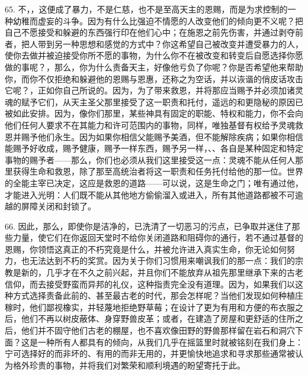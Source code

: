 65. 不，，这便成了暴力，不是仁慈，也不是至高天主的恩赐，而是为求控制的一种幼稚而虚妄的斗争。因为有什么比强迫不情愿的人改变他们的倾向更不义呢？把自己不愿接受和躲避的东西强行印在他们心中；在施恩之前先伤害，并通过剥夺前者，把人带到另一种思想和感觉的方式中？你这希望自己被改变并遭受暴力的人，使你去做并被迫接受你所不愿的事物，为什么你不在被改变和转变后自愿选择你愿做的事呢？，那么，你为什么责备天主，好像他亏负了你呢？你是否希望他来帮助你，而你不仅拒绝和躲避他的恩赐与恩惠，还称之为空话，并以诙谐的俏皮话攻击它呢？，正如你自己所说的。因为，为了带来救恩，并将那应当赐予并必须加诸灵魂的赋予它们，从天主圣父那里接受了这一职责和托付，遥远的和更隐秘的原因已被如此安排。因为，像你们那里，某些神具有固定的职能、特权和能力，你不会向他们任何人要求不在其能力和许可范围内的事物，同样，唯独基督有权给予灵魂救恩并赐予他们永生。因为如果你相信父能赐予美酒，但不能解除疾病；如果你相信能赐予好收成，赐予健康，赐予一样东西，赐予另一样，、、各自是某种固定和特定事物的赐予者——那么，你们也必须从我们这里接受这一点：灵魂不能从任何人那里获得生命和救恩，除了那至高统治者将这一职责和任务托付给他的那一位。世界的全能主宰已决定，这应是救恩的道路——可以说，这是生命之门；唯有通过他，才能进入光明：人们既不能从其他地方偷偷溜入或进入，所有其他道路都被不可逾越的屏障关闭和封锁了。\par

66. 因此，那么，即使你是洁净的，已洗清了一切恶习的污点，已争取并迷住了那些力量，使它们在你返回天堂时不给你关闭道路和阻碍你的通行，若不通过基督的恩赐，你领悟这真正的不朽究竟是什么，并被允许进入真实生命，你无论如何努力，也无法达到不朽的奖赏。因为关于你们习惯用来嘲讽我们的那一点：我们的宗教是新的，几乎才在不久之前兴起，并且你们不能放弃从祖先那里继承下来的古老信仰，而去接受野蛮而异邦的礼仪，这种指责完全没有道理。因为，如果我们以这种方式选择责备此前的、甚至最古老的时代，那会怎样呢？当他们发现如何种植庄稼时，他们鄙视橡实，并轻蔑地拒绝野草莓；在设计了更为有用和方便的布衣服之后，他们不再以树皮蔽体、身穿野兽皮革；或者，在建造了房屋和更舒适的住所之后，他们并不固守他们古老的棚屋，也不喜欢像田野的野兽那样留在岩石和洞穴下面？这是一种所有人都具有的倾向，从我们几乎在摇篮里时就被铭刻在我们身上：宁可选择好的而非坏的、有用的而非无用的，并更愉快地追求和寻求那些通常被认为格外珍贵的事物，并将我们对繁荣和顺利境遇的盼望寄托于此。\par

